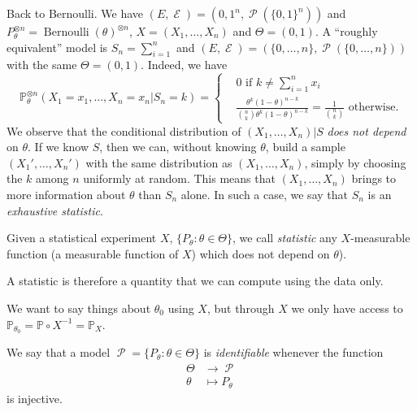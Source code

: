 \documentclass[
	fontsize=11pt, %
	twoside=false, %
	numbers=noenddot, %
]{kaobook}
\DeclareMathOperator{\cE}{\mathcal E}
\DeclareMathOperator{\cP}{\mathcal P}
\DeclareMathOperator{\ber}{Bernoulli}
\renewcommand{\P}{\mathbb P}
\begin{document}
Back to Bernoulli. We have $(E, \cE) = ({0, 1}^n, \cP(\{0, 1\}^n))$ and $P_\theta^{\otimes n} = \ber(\theta)^{\otimes n}$, $X = (X_1, \ldots, X_n)$ and $\Theta = (0, 1)$.
A ``roughly equivalent'' model is $S_n = \sum_{i=1}^n$ and $(E, \cE) = (\{ 0, \ldots, n\}, \cP(\{0, \ldots, n\}))$ with the same $\Theta = (0, 1)$.
Indeed, we have
\begin{equation*}
	\P_\theta^{\otimes n} (X_1 = x_1, \ldots, X_n = x_n | S_n=k) =
	\begin{cases}
	 & 0 \text{ if } k \neq \sum_{i=1}^n x_i \\
	 & \frac{\theta^k (1 - \theta)^{n-k}}{\binom{n}{k} 
	 \theta^k (1 - \theta)^{n-k}} = \frac{1}{\binom{n}{k} } \text{ otherwise.}
	\end{cases}
\end{equation*}
We observe that the conditional distribution of $(X_1, \ldots, X_n) | S$ \emph{does not depend} on $\theta$.
If we know $S$, then we can, without knowing $\theta$, build a sample $(X_1', \ldots, X_n')$ with the same distribution as $(X_1, \ldots, X_n)$, simply by choosing the $k$ among $n$ uniformly at random.
This means that $(X_1, \ldots, X_n)$ brings to more information about $\theta$ than $S_n$ alone.
In such a case, we say that $S_n$ is an \emph{exhaustive statistic}.

\begin{definition}
	Given a statistical experiment $X$, $\{ P_\theta : \theta \in \Theta \}$, we call \emph{statistic} any $X$-measurable function (a measurable function of $X$) which does not depend on $\theta$).
\end{definition}
A statistic is therefore a quantity that we can compute using the data only.


We want to say things about $\theta_0$ using $X$, but through $X$ we only have access to $\P_{\theta_0} = \P \circ X^{-1} = \P_X$.

\begin{definition}
	We say that a model $\cP = \{ P_\theta : \theta \in \Theta \}$ is \emph{identifiable} whenever the function
	\begin{align*}
		\Theta &\rightarrow \cP \\
		\theta &\mapsto P_\theta
	\end{align*}
	is injective.
\end{definition}

\end{document}
